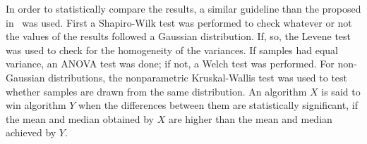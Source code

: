 %
In order to statistically compare the \HV{} results, a similar guideline than the proposed in~\cite{Joel:StatisticalTest} was used. 
%
First a Shapiro-Wilk test was performed to check whatever or not the values of the results followed a Gaussian distribution. 
%
If, so, the Levene test was used to check for the homogeneity of the variances. 
%
If samples had equal variance, an ANOVA test was done; if not, a Welch test was performed. 
%
For non-Gaussian distributions, the nonparametric Kruskal-Wallis test was used to test whether samples are drawn from the same distribution. 
%
An algorithm $X$ is said to win algorithm $Y$ when the differences between them are statistically significant, if the mean and median obtained by $X$ are higher than the mean and median achieved by $Y$.
%

